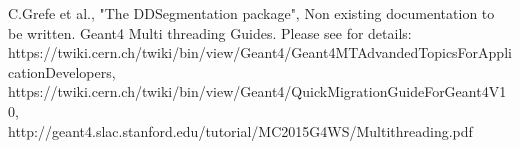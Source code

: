 \documentclass[10pt,a4paper]{article}
\begin{document}
\clearpage
%
%
\tableofcontents
\clearpage
%
%
\setcounter{page}{1}








\newpage
\begin{thebibliography}{9}

 C.Grefe et al.,
                   "The DDSegmentation package", 
                   Non existing documentation to be written.
 Geant4 Multi threading Guides. 
	Please see for details:\\
	https://twiki.cern.ch/twiki/bin/view/Geant4/Geant4MTAdvandedTopicsForApplicationDevelopers,\\
	https://twiki.cern.ch/twiki/bin/view/Geant4/QuickMigrationGuideForGeant4V10,\\
	http://geant4.slac.stanford.edu/tutorial/MC2015G4WS/Multithreading.pdf

\end{thebibliography}
\end{document}
